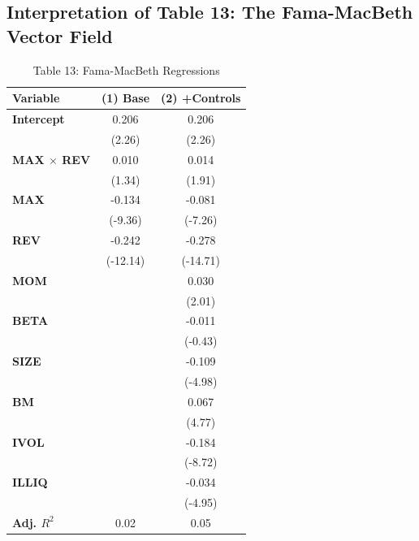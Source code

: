 \documentclass[11pt,a4paper]{article}
\begin{document}
\subsection{Interpretation of Table 13: The Fama-MacBeth Vector Field}

\begin{table}[h]
\centering
\caption{Table 13: Fama-MacBeth Regressions}
\begin{tabular}{lcc}
\toprule
\textbf{Variable} & \textbf{(1) Base} & \textbf{(2) +Controls} \\
\midrule
\textbf{Intercept} & 0.206 & 0.206 \\
 & (2.26) & (2.26) \\
\textbf{MAX $\times$ REV} & 0.010 & 0.014 \\
 & (1.34) & (1.91) \\
\textbf{MAX} & -0.134 & -0.081 \\
 & (-9.36) & (-7.26) \\
\textbf{REV} & -0.242 & -0.278 \\
 & (-12.14) & (-14.71) \\
\textbf{MOM} &  & 0.030 \\
 &  & (2.01) \\
\textbf{BETA} &  & -0.011 \\
 &  & (-0.43) \\
\textbf{SIZE} &  & -0.109 \\
 &  & (-4.98) \\
\textbf{BM} &  & 0.067 \\
 &  & (4.77) \\
\textbf{IVOL} &  & -0.184 \\
 &  & (-8.72) \\
\textbf{ILLIQ} &  & -0.034 \\
 &  & (-4.95) \\
\textbf{Adj. $R^2$} & 0.02 & 0.05 \\
\bottomrule
\end{tabular}
\end{table}
\end{document}
